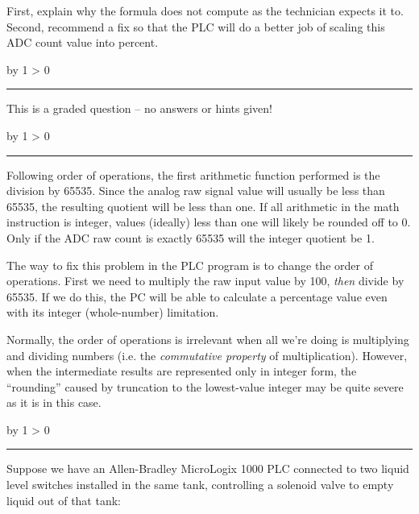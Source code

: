 \documentclass[12pt,a4paper]{article}
\def\oppgave{
            \advance\questnum by 1
            \ifnum \questnum > 0
                 \hrule
                 \vskip 3pt
                 \leftline{Oppgave \the\questnum}
                 \vskip 3pt \fi}
\def\svar{
           \advance\answnum by 1
           \ifnum \answnum > 0
                \hrule
                \vskip 3pt
                \leftline{Svar \the\answnum}
                \vskip 3pt \fi}
\def\notes{
           \advance\explnum by 1
           \ifnum \explnum > 0
                \hrule
                \vskip 3pt
                \leftline{Notes \the\explnum}
                \vskip 3pt \fi}
\begin{document}
\vskip 10pt

First, explain why the formula does not compute as the technician expects it to.  Second, recommend a fix so that the PLC will do a better job of scaling this ADC count value into percent.

\vfil

\eject
\vskip 10pt \filbreak 





\svar{} 

This is a graded question -- no answers or hints given!

\vskip 10pt \filbreak 





\notes{} 

Following order of operations, the first arithmetic function performed is the division by 65535.  Since the analog raw signal value will usually be less than 65535, the resulting quotient will be less than one.  If all arithmetic in the math instruction is integer, values (ideally) less than one will likely be rounded off to 0.  Only if the ADC raw count is exactly 65535 will the integer quotient be 1.

\vskip 10pt

The way to fix this problem in the PLC program is to change the order of operations.  First we need to multiply the raw input value by 100, {\it then} divide by 65535.  If we do this, the PC will be able to calculate a percentage value even with its integer (whole-number) limitation. 

Normally, the order of operations is irrelevant when all we're doing is multiplying and dividing numbers (i.e. the {\it commutative property} of multiplication).  However, when the intermediate results are represented only in integer form, the ``rounding'' caused by truncation to the lowest-value integer may be quite severe as it is in this case.


\vfil \eject 



\oppgave{} 

Suppose we have an Allen-Bradley MicroLogix 1000 PLC connected to two liquid level switches installed in the same tank, controlling a solenoid valve to empty liquid out of that tank:
\end{document}
